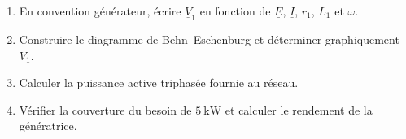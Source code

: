 \begin{enumerate}
  \item En convention générateur, écrire $\underline V_1$ en fonction de $\underline E$, $\underline I$, $r_1$, $L_1$ et $\omega$.
  \item Construire le diagramme de Behn--Eschenburg et déterminer graphiquement $V_1$.
  \item Calculer la puissance active triphasée fournie au réseau.
  \item Vérifier la couverture du besoin de $5\ \mathrm{kW}$ et calculer le rendement de la génératrice.
\end{enumerate}
